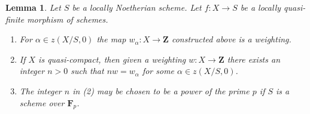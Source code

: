 \documentclass{stacks-project}
\theoremstyle{plain}
\newtheorem{lemma}[subsection]{Lemma}
\theoremstyle{definition}
\theoremstyle{remark}
\numberwithin{equation}{subsection}
\begin{document}
\begin{lemma}
\label{lemma-weightings}
Let $S$ be a locally Noetherian scheme. Let $f : X \to S$ be a locally
quasi-finite morphism of schemes.
\begin{enumerate}
\item For $\alpha \in z(X/S, 0)$ the map $w_\alpha : X \to \mathbf{Z}$
constructed above is a weighting.
\item If $X$ is quasi-compact, then given a weighting
$w : X \to \mathbf{Z}$ there exists an integer $n > 0$ such
that $nw = w_\alpha$ for some $\alpha \in z(X/S, 0)$.
\item The integer $n$ in (2) may be chosen to be a power of
the prime $p$ if $S$ is a scheme over $\mathbf{F}_p$.
\end{enumerate}
\end{lemma}
\end{document}
